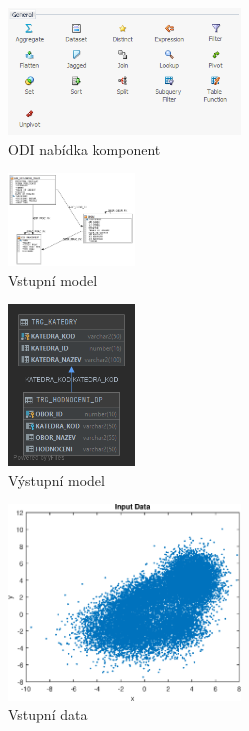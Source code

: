 \begin{figure}[htb]
    \centering
    \includegraphics[width=0.55\textwidth]{graphs/odi-transformation-components.png}
    \caption{ODI nabídka komponent}
    \label{fig:odi-transformation-components}
\end{figure}
\FloatBarrier

\begin{figure}[htb]
    \centering
    \includegraphics[width=0.3\textwidth]{graphs/src-model.png}
    \caption{Vstupní model}
    \label{fig:src-model}
\end{figure}
\FloatBarrier

\begin{figure}[htb]
    \centering
    \includegraphics[width=0.3\textwidth]{graphs/trg-model.png}
    \caption{Výstupní model}
    \label{fig:trg-model}
\end{figure}
\FloatBarrier

\begin{figure}[htb]
    \centering
    \includegraphics[width=0.55\textwidth]{graphs/fig1.eps}
    \caption{Vstupní data}
    \label{fig:result1}
\end{figure}
\FloatBarrier

